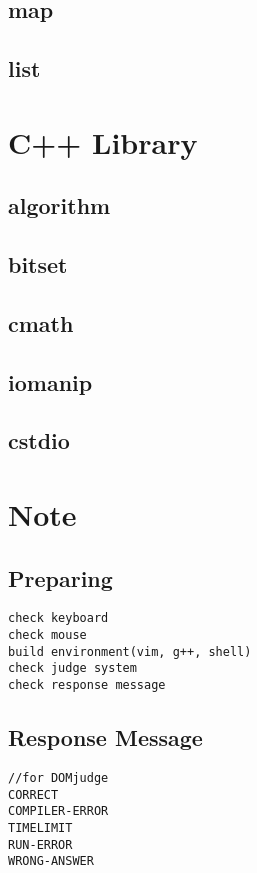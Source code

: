\documentclass[a4paper, landscape, 8pt]{article}
\begin{document}
\begin{multicols*}{3}
\subsection{map}

\subsection{list}


\section{C++ Library}
\subsection{algorithm}

\subsection{bitset}

\subsection{cmath}

\subsection{iomanip}

\subsection{cstdio}


\section{Note}
\subsection{Preparing}
\begin{lstlisting}[]
check keyboard
check mouse
build environment(vim, g++, shell)
check judge system
check response message
\end{lstlisting}
\subsection{Response Message}
\begin{lstlisting}[]
//for DOMjudge
CORRECT
COMPILER-ERROR
TIMELIMIT
RUN-ERROR
WRONG-ANSWER
\end{lstlisting}

\end{multicols*}
\end{document}
